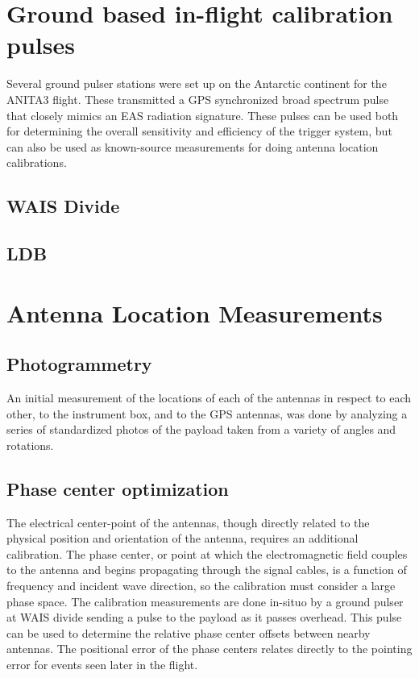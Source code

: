 \section{Ground based in-flight calibration pulses}
	Several ground pulser stations were set up on the Antarctic continent for the ANITA3 flight.  These transmitted a GPS synchronized broad spectrum pulse that closely mimics an EAS radiation signature.  These pulses can be used both for determining the overall sensitivity and efficiency of the trigger system, but can also be used as known-source measurements for doing antenna location calibrations. 
	
	\subsection{WAIS Divide}


	\subsection{LDB}



\section{Antenna Location Measurements}
	\subsection{Photogrammetry}
		An initial measurement of the locations of each of the antennas in respect to each other, to the instrument box, and to the GPS antennas, was done by analyzing a series of standardized photos of the payload taken from a variety of angles and rotations.
		
		
	\subsection{Phase center optimization}
		The electrical center-point of the antennas, though directly related to the physical position and orientation of the antenna, requires an additional calibration.  The phase center, or point at which the electromagnetic field couples to the antenna and begins propagating through the signal cables, is a function of frequency and incident wave direction, so the calibration must consider a large phase space.  The calibration measurements are done in-situo by a ground pulser at WAIS divide sending a pulse to the payload as it passes overhead.  This pulse can be used to determine  the relative phase center offsets between nearby antennas.  The positional error of the phase centers relates directly to the pointing error for events seen later in the flight.

